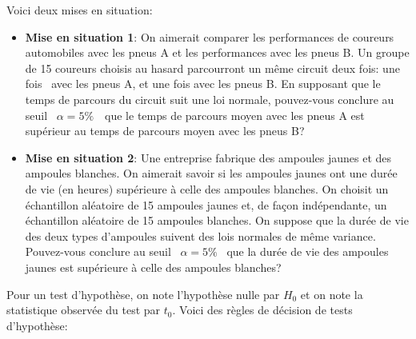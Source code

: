 \begin{questions}
\begin{parts}
\end{parts}

	\begin{solution}
  (a) $$ t_0 = \frac{\overline{x}-\mu_0}{\sqrt{S^2/n}} = \frac{ 5,4- 5}{\sqrt{4/16}} = \frac{0,4}{0,5} = 0,800 $$ \\
  Erreurs possibles: 
  $ t_0 = \frac{ 5,4- 5}{{4/16}} = 1,6 $
  $ t_{n-1, \alpha} = t_{15; 0,10} = 1,341 $
  $ t_{n-1, \alpha/et 2} = t_{15; 0,05} = 1,753 $
  $ z_{\alpha/2 = z_{0,05} = 1,645$
  \\
 (b) $$ \alpha^* =  P( t_{n-1} > t_0 ) = P( t_{15} > 0,8 ) =  0.218099  > \alpha = 0,10$$
		(En R: pt(0.8, df=15, lower.tail=FALSE) )
		On ne rejette pas $H_0$. Réponse: 	B.
	\end{solution}


\newpage

\question\label{2moyregle}

Voici deux mises en situation:
\begin{itemize}
    \item {\bf Mise en situation 1}: On aimerait comparer les performances de coureurs automobiles avec les pneus A et les performances avec les pneus B. Un groupe de 15 coureurs choisis au hasard parcourront un même circuit deux fois: une fois  avec les pneus A, et une fois avec les pneus B. En supposant que le temps de parcours du circuit suit une loi normale, pouvez-vous conclure au seuil  $\alpha=5\%$  que le temps de parcours moyen avec les pneus A est supérieur au temps de parcours moyen avec les pneus B?
    \item {\bf Mise en situation 2}: Une entreprise fabrique des ampoules jaunes et des ampoules blanches. On aimerait savoir si les ampoules jaunes ont une durée de vie (en heures) supérieure à celle des ampoules blanches. On choisit un échantillon aléatoire de 15 ampoules jaunes et, de façon indépendante, un échantillon aléatoire de 15 ampoules blanches. On suppose que la durée de vie des deux types d'ampoules suivent des lois normales de même variance. Pouvez-vous conclure au seuil  $\alpha=5\%$  que la durée de vie des ampoules jaunes est supérieure à celle des ampoules blanches?
\end{itemize}

\medskip

Pour un test d'hypothèse, on note l'hypothèse nulle par $H_0$ et on note la statistique observée du test par $t_0$. Voici des règles de décision de tests d'hypothèse:


\end{questions}
